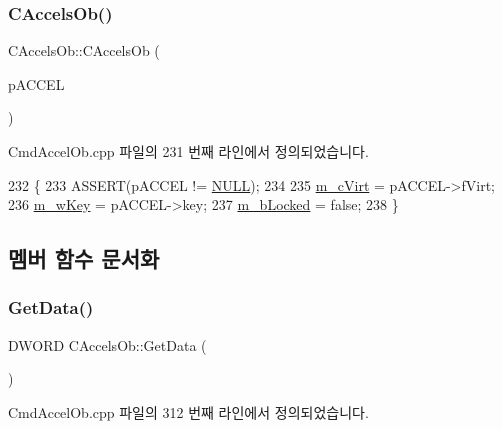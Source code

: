 \subsubsection{\texorpdfstring{C\+Accels\+Ob()}{CAccelsOb()}\hspace{0.1cm}{\footnotesize\ttfamily [4/4]}}
{\footnotesize\ttfamily C\+Accels\+Ob\+::\+C\+Accels\+Ob (\begin{DoxyParamCaption}\item[{L\+P\+A\+C\+C\+EL}]{p\+A\+C\+C\+EL }\end{DoxyParamCaption})}



Cmd\+Accel\+Ob.\+cpp 파일의 231 번째 라인에서 정의되었습니다.


\begin{DoxyCode}
232 \{
233   ASSERT(pACCEL != \mbox{\hyperlink{getopt1_8c_a070d2ce7b6bb7e5c05602aa8c308d0c4}{NULL}});
234   
235   \mbox{\hyperlink{class_c_accels_ob_a08b7003ccf92c6afcf31878960d8eee1}{m\_cVirt}} = pACCEL->fVirt;
236   \mbox{\hyperlink{class_c_accels_ob_a1891250e9a4d00c0862f3a90a965d635}{m\_wKey}} = pACCEL->key;
237   \mbox{\hyperlink{class_c_accels_ob_ad8300bd20bd429ad61f89700e388dd9a}{m\_bLocked}} = \textcolor{keyword}{false};
238 \}
\end{DoxyCode}


\subsection{멤버 함수 문서화}
\mbox{\label{class_c_accels_ob_abbbdc5e93061f67ade785c9e4f07b918}} 
\subsubsection{\texorpdfstring{Get\+Data()}{GetData()}}
{\footnotesize\ttfamily D\+W\+O\+RD C\+Accels\+Ob\+::\+Get\+Data (\begin{DoxyParamCaption}{ }\end{DoxyParamCaption})}



Cmd\+Accel\+Ob.\+cpp 파일의 312 번째 라인에서 정의되었습니다.


